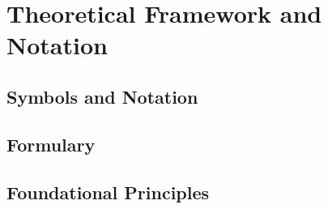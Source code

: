 \section{Theoretical Framework and Notation}

\subsection{Symbols and Notation}


\newpage

\subsection{Formulary}


\newpage

\subsection{Foundational Principles}

